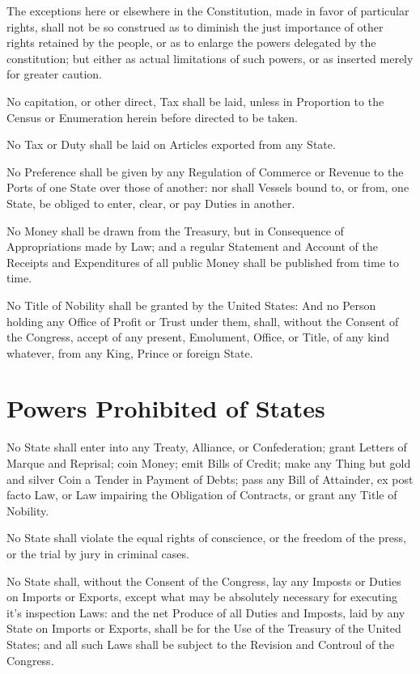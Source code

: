 \documentclass{constitution}
\begin{document}
The exceptions here or elsewhere in the Constitution,
made in favor of particular rights,
shall not be so construed
as to diminish the just importance of other rights retained by the people,
or as to enlarge the powers delegated by the constitution;
but either as actual limitations of such powers,
or as inserted merely for greater caution.

No capitation, or other direct, Tax shall be laid,
unless in Proportion to the Census or Enumeration herein before directed to be taken.

No Tax or Duty shall be laid on Articles exported from any State.

No Preference shall be given by any Regulation of Commerce or Revenue
to the Ports of one State over those of another:
nor shall Vessels bound to, or from, one State,
be obliged to enter, clear, or pay Duties in another.

No Money shall be drawn from the Treasury,
but in Consequence of Appropriations made by Law;
and a regular Statement and Account
of the Receipts and Expenditures of all public Money
shall be published from time to time.

No Title of Nobility shall be granted by the United States:
And no Person holding any Office of Profit or Trust under them, shall,
without the Consent of the Congress,
accept of any present, Emolument, Office, or Title, of any kind whatever,
from any King, Prince or foreign State.

\section{Powers Prohibited of States}
No State shall enter into any Treaty, Alliance, or Confederation;
grant Letters of Marque and Reprisal;
coin Money;
emit Bills of Credit;
make any Thing but gold and silver Coin a Tender in Payment of Debts;
pass any Bill of Attainder,
ex post facto Law,
or Law impairing the Obligation of Contracts,
or grant any Title of Nobility.

No State shall violate the equal rights of conscience,
	or the freedom of the press,
	or the trial by jury in criminal cases.

No State shall, without the Consent of the Congress,
lay any Imposts or Duties on Imports or Exports,
except what may be absolutely necessary for executing it's inspection Laws:
and the net Produce of all Duties and Imposts,
laid by any State on Imports or Exports,
shall be for the Use of the Treasury of the United States;
and all such Laws shall be subject to the Revision and Controul of the Congress.
\end{document}
